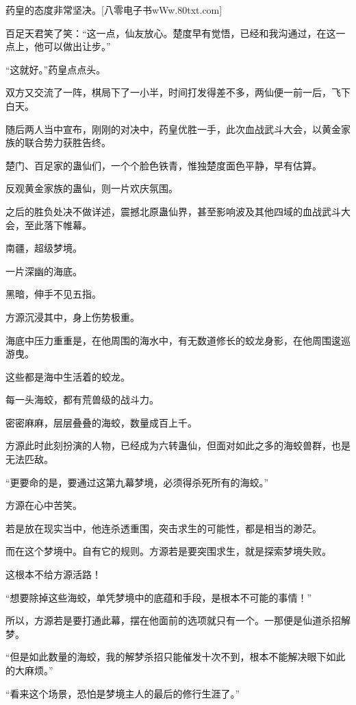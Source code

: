 
\begin{this_body}

药皇的态度非常坚决。[八零电子书wWw.80txt.com]

百足天君笑了笑：“这一点，仙友放心。楚度早有觉悟，已经和我沟通过，在这一点上，他可以做出让步。”

“这就好。”药皇点点头。

双方又交流了一阵，棋局下了一小半，时间打发得差不多，两仙便一前一后，飞下白天。

随后两人当中宣布，刚刚的对决中，药皇优胜一手，此次血战武斗大会，以黄金家族的联合势力获胜告终。

楚门、百足家的蛊仙们，一个个脸色铁青，惟独楚度面色平静，早有估算。

反观黄金家族的蛊仙，则一片欢庆氛围。

之后的胜负处决不做详述，震撼北原蛊仙界，甚至影响波及其他四域的血战武斗大会，至此落下帷幕。

南疆，超级梦境。

一片深幽的海底。

黑暗，伸手不见五指。

方源沉浸其中，身上伤势极重。

海底中压力重重是，在他周围的海水中，有无数道修长的蛟龙身影，在他周围逡巡游曳。

这些都是海中生活着的蛟龙。

每一头海蛟，都有荒兽级的战斗力。

密密麻麻，层层叠叠的海蛟，数量成百上千。

方源此时此刻扮演的人物，已经成为六转蛊仙，但面对如此之多的海蛟兽群，也是无法匹敌。

“更要命的是，要通过这第九幕梦境，必须得杀死所有的海蛟。”

方源在心中苦笑。

若是放在现实当中，他连杀透重围，突击求生的可能性，都是相当的渺茫。

而在这个梦境中。自有它的规则。方源若是要突围求生，就是探索梦境失败。

这根本不给方源活路！

“想要除掉这些海蛟，单凭梦境中的底蕴和手段，是根本不可能的事情！”

所以，方源若是要打通此幕，摆在他面前的选项就只有一个。一那便是仙道杀招解梦。

“但是如此数量的海蛟，我的解梦杀招只能催发十次不到，根本不能解决眼下如此的大麻烦。”

“看来这个场景，恐怕是梦境主人的最后的修行生涯了。”


\end{this_body}
